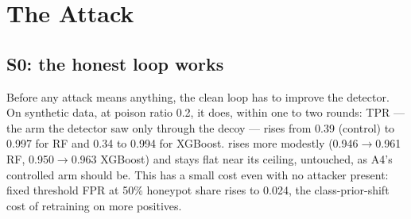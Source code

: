 \section{The Attack}
\label{sec:attack}

\subsection{S0: the honest loop works}
Before any attack means anything, the clean loop has to improve the detector. On synthetic
data, at poison ratio 0.2, it does, within one to two rounds:  TPR — the
arm the detector saw only through the decoy — rises from 0.39 (control) to 0.997 for RF and
0.34 to 0.994 for XGBoost.  rises more modestly (0.946$\to$0.961 RF,
0.950$\to$0.963 XGBoost) and  stays flat near its ceiling, untouched, as
A4's controlled arm should be. This has a small cost even with no attacker present: fixed
threshold FPR at 50\% honeypot share rises to 0.024, the class-prior-shift cost of retraining
on more positives.

